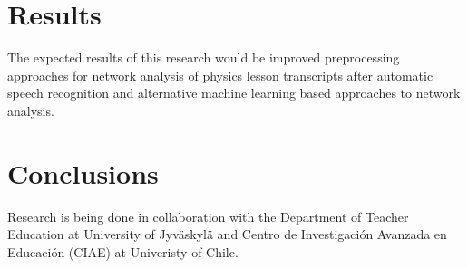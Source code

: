 \documentclass[utf8,english]{gradu3}
\begin{document}
\chapter{Results}

The expected results of this research would be improved preprocessing approaches for network analysis of physics lesson transcripts after automatic speech recognition and alternative machine learning based approaches to network analysis.

\chapter{Conclusions}

Research is being done in collaboration with the Department of Teacher Education at University of Jyväskylä and Centro de Investigación Avanzada en Educación (CIAE) at Univeristy of Chile.
 
\printbibliography
\end{document}
